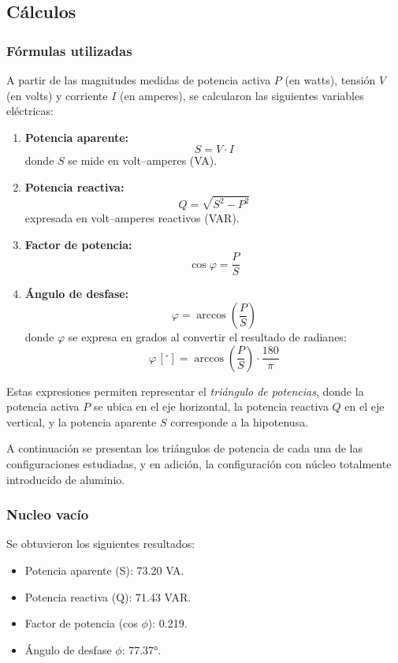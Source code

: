 \documentclass{article}
\begin{document}
    \subsection{Cálculos}

    \subsubsection*{Fórmulas utilizadas}

A partir de las magnitudes medidas de potencia activa $P$ (en watts), 
tensión $V$ (en volts) y corriente $I$ (en amperes), se calcularon las 
siguientes variables eléctricas:

\begin{enumerate}
    \item \textbf{Potencia aparente:}
    \[
        S = V \cdot I
    \]
    donde $S$ se mide en volt–amperes (VA).

    \item \textbf{Potencia reactiva:}
    \[
        Q = \sqrt{S^{2} - P^{2}}
    \]
    expresada en volt–amperes reactivos (VAR).

    \item \textbf{Factor de potencia:}
    \[
        \cos \varphi = \frac{P}{S}
    \]

    \item \textbf{Ángulo de desfase:}
    \[
        \varphi = \arccos\left( \frac{P}{S} \right)
    \]
    donde $\varphi$ se expresa en grados al convertir el resultado de 
    radianes:
    \[
        \varphi \,[^\circ] = \arccos\left( \frac{P}{S} \right) \cdot 
        \frac{180}{\pi}
    \]
\end{enumerate}

        Estas expresiones permiten representar el \textit{triángulo de potencias}, 
        donde la potencia activa $P$ se ubica en el eje horizontal, la potencia 
        reactiva $Q$ en el eje vertical, y la potencia aparente $S$ corresponde a 
        la hipotenusa.

        A continuación se presentan los triángulos de potencia de cada una de las configuraciones estudiadas, y en adición,
        la configuración con núcleo totalmente introducido de aluminio. 

        \subsubsection{Nucleo vacío}
            Se obtuvieron los siguientes resultados:
            \begin{itemize}
                \item Potencia aparente (S): 73.20 VA.
                \item Potencia reactiva (Q): 71.43 VAR.
                \item Factor de potencia (cos $\phi$): 0.219.
                \item Ángulo de desfase $\phi$: 77.37°.
            \end{itemize}
\end{document}
